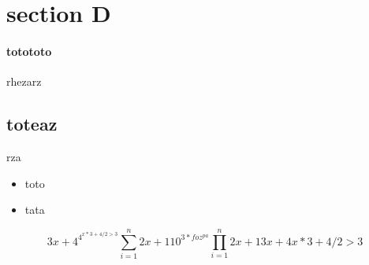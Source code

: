 \documentclass{report}
\begin{document}
\section{section D}{\paragraph{totototo}{rhezarz}\subsection{toteaz}{rza}}
\begin{itemize}
	 \item toto

	        \item tata    
\end{itemize}
\begin{equation}
3x+4^{4^{x*3+4/2 > 3}}
{\sum_{i=1 }^{n} 2x+1} 
10^{3*foz^{pa}}
{\prod_{i=1 }^{n} 2x+1}
3x+4x*3+4/2 > 3
\end{equation}
\end{document}
